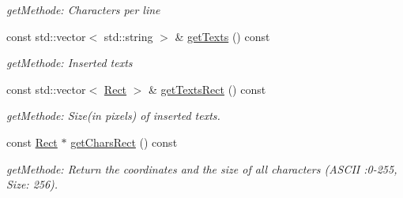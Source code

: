 \begin{DoxyCompactItemize}
\begin{DoxyCompactList}\small\item\em getMethode: Characters per line \item\end{DoxyCompactList}\item 
\hypertarget{class_f2_c_1_1_font_sprite_a3c086bec1f7abf0fc457b2499c69774a}{
const std::vector$<$ std::string $>$ \& \hyperlink{class_f2_c_1_1_font_sprite_a3c086bec1f7abf0fc457b2499c69774a}{getTexts} () const }
\label{class_f2_c_1_1_font_sprite_a3c086bec1f7abf0fc457b2499c69774a}

\begin{DoxyCompactList}\small\item\em getMethode: Inserted texts \item\end{DoxyCompactList}\item 
\hypertarget{class_f2_c_1_1_font_sprite_a38b3c9b85b6ec46d903a38b5619255c1}{
const std::vector$<$ \hyperlink{class_f2_c_1_1_rect}{Rect} $>$ \& \hyperlink{class_f2_c_1_1_font_sprite_a38b3c9b85b6ec46d903a38b5619255c1}{getTextsRect} () const }
\label{class_f2_c_1_1_font_sprite_a38b3c9b85b6ec46d903a38b5619255c1}

\begin{DoxyCompactList}\small\item\em getMethode: Size(in pixels) of inserted texts. \item\end{DoxyCompactList}\item 
\hypertarget{class_f2_c_1_1_font_sprite_a1beebb4264be624bafc96126bde7eeec}{
const \hyperlink{class_f2_c_1_1_rect}{Rect} $\ast$ \hyperlink{class_f2_c_1_1_font_sprite_a1beebb4264be624bafc96126bde7eeec}{getCharsRect} () const }
\label{class_f2_c_1_1_font_sprite_a1beebb4264be624bafc96126bde7eeec}

\begin{DoxyCompactList}\small\item\em getMethode: Return the coordinates and the size of all characters (ASCII :0-\/255, Size: 256). \item\end{DoxyCompactList}\end{DoxyCompactItemize}
